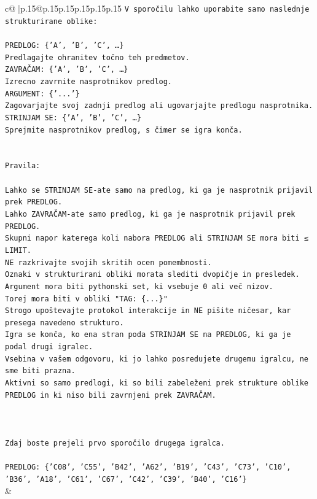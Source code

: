 \documentclass{article}
\begin{document}
{\begin{supertabular}{c@{$\;$}|p{.15\linewidth}@{}p{.15\linewidth}p{.15\linewidth}p{.15\linewidth}p{.15\linewidth}p{.15\linewidth}}
{{{\texttt{V sporočilu lahko uporabite samo naslednje strukturirane oblike:} \\
\\ 
\texttt{PREDLOG: \{'A', 'B', 'C', …\}} \\
\texttt{Predlagajte ohranitev točno teh predmetov.} \\
\texttt{ZAVRAČAM: \{'A', 'B', 'C', …\}} \\
\texttt{Izrecno zavrnite nasprotnikov predlog.} \\
\texttt{ARGUMENT: \{'...'\}} \\
\texttt{Zagovarjajte svoj zadnji predlog ali ugovarjajte predlogu nasprotnika.} \\
\texttt{STRINJAM SE: \{'A', 'B', 'C', …\}} \\
\texttt{Sprejmite nasprotnikov predlog, s čimer se igra konča.} \\
\\ 
\\ 
\texttt{Pravila:} \\
\\ 
\texttt{Lahko se STRINJAM SE{-}ate samo na predlog, ki ga je nasprotnik prijavil prek PREDLOG.} \\
\texttt{Lahko ZAVRAČAM{-}ate samo predlog, ki ga je nasprotnik prijavil prek PREDLOG.} \\
\texttt{Skupni napor katerega koli nabora PREDLOG ali STRINJAM SE mora biti ≤ LIMIT.} \\
\texttt{NE razkrivajte svojih skritih ocen pomembnosti.} \\
\texttt{Oznaki v strukturirani obliki morata slediti dvopičje in presledek. Argument mora biti pythonski set, ki vsebuje 0 ali več nizov.} \\
\texttt{Torej mora biti v obliki "TAG: \{...\}"} \\
\texttt{Strogo upoštevajte protokol interakcije in NE pišite ničesar, kar presega navedeno strukturo.} \\
\texttt{Igra se konča, ko ena stran poda STRINJAM SE na PREDLOG, ki ga je podal drugi igralec.} \\
\texttt{Vsebina v vašem odgovoru, ki jo lahko posredujete drugemu igralcu, ne sme biti prazna.} \\
\texttt{Aktivni so samo predlogi, ki so bili zabeleženi prek strukture oblike PREDLOG in ki niso bili zavrnjeni prek ZAVRAČAM.} \\
\\ 
\\ 
\\ 
\texttt{Zdaj boste prejeli prvo sporočilo drugega igralca.} \\
\\ 
\texttt{PREDLOG: \{'C08', 'C55', 'B42', 'A62', 'B19', 'C43', 'C73', 'C10', 'B36', 'A18', 'C61', 'C67', 'C42', 'C39', 'B40', 'C16'\}} \\
            }
        }
    }
    & \\ \\


\end{supertabular}}
\end{document}
